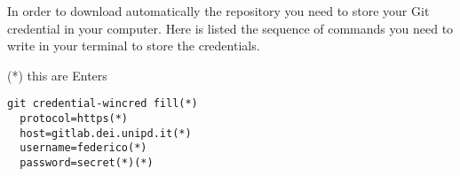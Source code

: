 In order to download automatically the repository you need to store your Git credential in your computer. Here is listed the sequence of commands you need to write in your terminal to store the credentials.

(*) this are Enters
\begin{lstlisting}[gobble=2]
  git credential-wincred fill(*)
  protocol=https(*)
  host=gitlab.dei.unipd.it(*)
  username=federico(*)
  password=secret(*)(*)
\end{lstlisting}
